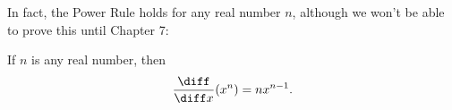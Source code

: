 \begin{frame}
In fact, the Power Rule holds for any real number $n$, although we won't be able to prove this until Chapter 7:
\begin{theorem}
If $n$ is any real number, then
\[
\frac{\diff}{\diff x} (x^n) = nx^{n-1}.
\]
\end{theorem}
\end{frame}
